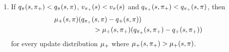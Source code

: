 \begin{lemma}
\begin{enumerate}
    \item If $q_{\pi}(s, \pi_+) < q_{\pi}(s, \pi)$, $v_{\pi_+}(s) < v_{\pi}(s)$ and $q_{\pi_+}(s, \pi_+) < q_{\pi_+}(s, \pi)$, then
    \begin{align}
        \nonumber
        &\mu_+(s, \pi) (q_{\pi_+}(s, \pi) - q_+(s, \pi))
        \\
        & \hspace{2cm} >
        \mu_+(s, \pi_+) (q_{\pi_+}(s, \pi_+) - q_+(s, \pi_+))
    \end{align}
    for every update distribution $\mu_+$ where $\mu_+(s, \pi_+) > \mu_+(s, \pi)$.
\end{enumerate}
\end{lemma}

